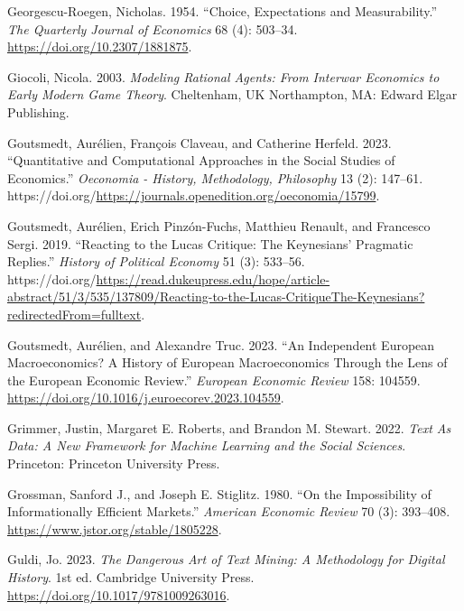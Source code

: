 \documentclass[
]{interact}
\newlength{\cslhangindent}
\newenvironment{CSLReferences}[2] %
 {\begin{list}{}{%
  \setlength{\itemindent}{0pt}
  \setlength{\leftmargin}{0pt}
  \setlength{\parsep}{0pt}
  \ifodd #1
   \setlength{\leftmargin}{\cslhangindent}
   \setlength{\itemindent}{-1\cslhangindent}
  \fi
  \setlength{\itemsep}{#2\baselineskip}}}
 {\end{list}}
\begin{document}
\begin{CSLReferences}{1}{0}
Georgescu-Roegen, Nicholas. 1954. {``Choice, {Expectations} and
{Measurability}.''} \emph{The Quarterly Journal of Economics} 68 (4):
503--34. \url{https://doi.org/10.2307/1881875}.

Giocoli, Nicola. 2003. \emph{Modeling Rational Agents: From Interwar
Economics to Early Modern Game Theory}. Cheltenham, UK Northampton, MA:
Edward Elgar Publishing.

Goutsmedt, Aurélien, François Claveau, and Catherine Herfeld. 2023.
{``Quantitative and {Computational Approaches} in the {Social Studies}
of {Economics}.''} \emph{Oeconomia - History, Methodology, Philosophy}
13 (2): 147--61.
https://doi.org/\url{https://journals.openedition.org/oeconomia/15799}.

Goutsmedt, Aurélien, Erich Pinzón-Fuchs, Matthieu Renault, and Francesco
Sergi. 2019. {``Reacting to the {Lucas Critique}: {The Keynesians}'
{Pragmatic Replies}.''} \emph{History of Political Economy} 51 (3):
533--56.
https://doi.org/\url{https://read.dukeupress.edu/hope/article-abstract/51/3/535/137809/Reacting-to-the-Lucas-CritiqueThe-Keynesians?redirectedFrom=fulltext}.

Goutsmedt, Aurélien, and Alexandre Truc. 2023. {``An {Independent
European Macroeconomics}? {A History} of {European Macroeconomics}
Through the {Lens} of the {European Economic Review}.''} \emph{European
Economic Review} 158: 104559.
\url{https://doi.org/10.1016/j.euroecorev.2023.104559}.

Grimmer, Justin, Margaret E. Roberts, and Brandon M. Stewart. 2022.
\emph{Text {As Data}: {A New Framework} for {Machine Learning} and the
{Social Sciences}}. Princeton: Princeton University Press.

Grossman, Sanford J., and Joseph E. Stiglitz. 1980. {``On the
Impossibility of Informationally Efficient Markets.''} \emph{American
Economic Review} 70 (3): 393--408.
\url{https://www.jstor.org/stable/1805228}.

Guldi, Jo. 2023. \emph{The {Dangerous Art} of {Text Mining}: {A
Methodology} for {Digital History}}. 1st ed. Cambridge University Press.
\url{https://doi.org/10.1017/9781009263016}.


\end{CSLReferences}
\end{document}
